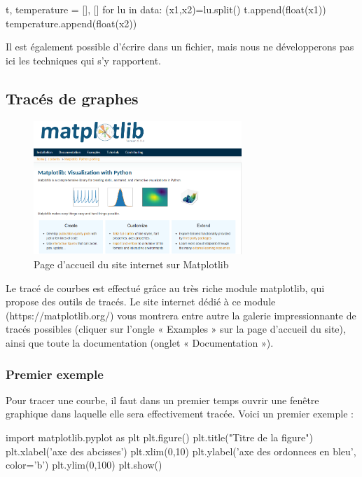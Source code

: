 \documentclass[a4paper,11pt,titlepage]{report}
\begin{document}
\begin{codePython}
t, temperature = [], []
for lu in data:
    (x1,x2)=lu.split()
    t.append(float(x1))
    temperature.append(float(x2))
\end{codePython}

Il est également possible d'écrire dans un fichier, mais nous ne développerons pas ici les techniques qui s'y rapportent.

\subsection{Tracés de graphes}

\begin{figure}[!h]
\centering
\includegraphics[width=0.7\textwidth]{image/matplotlib_site.png}
\caption{Page d'accueil du site internet sur Matplotlib}
\label{matplotlib_site}
\end{figure}

Le tracé de courbes est effectué grâce au très riche module matplotlib, qui propose des outils de tracés. Le site internet dédié à ce module (https://matplotlib.org/) vous montrera entre autre la galerie impressionnante de tracés possibles (cliquer sur l’ongle « Examples » sur la page d’accueil du site), ainsi que toute la documentation (onglet « Documentation »).

\subsubsection{Premier exemple}

Pour tracer une courbe, il faut dans un premier temps ouvrir une fenêtre graphique dans laquelle elle sera effectivement tracée. Voici un premier exemple :

\begin{codePython}
import matplotlib.pyplot as plt
plt.figure() plt.title("Titre de la figure")
plt.xlabel('axe des abcisses')
plt.xlim(0,10)
plt.ylabel('axe des ordonnees en bleu', color='b')
plt.ylim(0,100)
plt.show()
\end{codePython}
\end{document}
